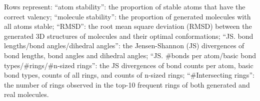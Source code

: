 \begin{table*}[!h]
\begin{scriptsize}
\begin{threeparttable}
\begin{tablenotes}
		\begin{footnotesize}
	\item 
\!\!Rows represent:  {``atom stability'': the proportion of stable atoms that have the correct valency; 
		``molecule stability'': the proportion of generated molecules with all atoms stable;
		``RMSD'': the root mean square deviation (RMSD) between the generated 3D structures of molecules and their optimal conformations; %
		``JS. bond lengths/bond angles/dihedral angles'': the Jensen-Shannon (JS) divergences of bond lengths, bond angles and dihedral angles;
		``JS. \#bonds per atom/basic bond types/\#rings/\#n-sized rings'': the JS divergences of bond counts per atom, basic bond types, counts of all rings, and counts of n-sized rings;
		``\#Intersecting rings'': the number of rings observed in the top-10 frequent rings of both generated and real molecules. } \par
		\par
		\end{footnotesize}
	\end{tablenotes}
\end{threeparttable}
\end{scriptsize}
\end{table*}
